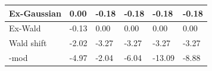 \begin{tabular}{|l|l|l|l|l|l|}
\hline
Ex-Gaussian&0.00&-0.18&-0.18&-0.18&-0.18\\\hline
Ex-Wald&-0.13&0.00&0.00&0.00&0.00\\\hline
Wald shift&-2.02&-3.27&-3.27&-3.27&-3.27\\\hline
\rocdd{}-mod&-4.97&-2.04&-6.04&-13.09&-8.88\\\hline
\end{tabular}
